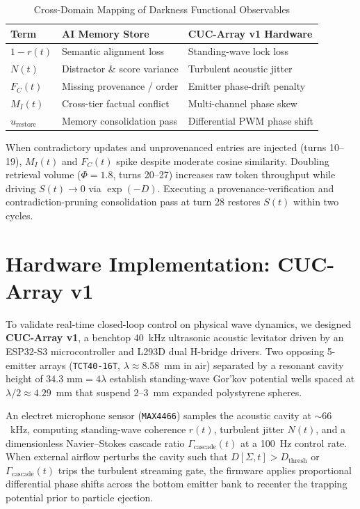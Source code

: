 \documentclass[11pt,twocolumn]{article}
\begin{document}
\begin{table}[h]
\centering
\caption{Cross-Domain Mapping of Darkness Functional Observables}
\label{tab:mapping}
\small
\begin{tabular}{@{}lll@{}}
\toprule
\textbf{Term} & \textbf{AI Memory Store} & \textbf{CUC-Array v1 Hardware} \\
\midrule
$1 - r(t)$ & Semantic alignment loss & Standing-wave lock loss \\
$N(t)$ & Distractor \& score variance & Turbulent acoustic jitter \\
$F_C(t)$ & Missing provenance / order & Emitter phase-drift penalty \\
$M_I(t)$ & Cross-tier factual conflict & Multi-channel phase skew \\
$u_{\text{restore}}$ & Memory consolidation pass & Differential PWM phase shift \\
\bottomrule
\end{tabular}
\end{table}

When contradictory updates and unprovenanced entries are injected (turns 10--19), $M_I(t)$ and $F_C(t)$ spike despite moderate cosine similarity. Doubling retrieval volume ($\Phi = 1.8$, turns 20--27) increases raw token throughput while driving $S(t) \to 0$ via $\exp(-D)$. Executing a provenance-verification and contradiction-pruning consolidation pass at turn 28 restores $S(t)$ within two cycles.

\section{Hardware Implementation: CUC-Array v1}
To validate real-time closed-loop control on physical wave dynamics, we designed \textbf{CUC-Array v1}, a benchtop 40~kHz ultrasonic acoustic levitator driven by an ESP32-S3 microcontroller and L293D dual H-bridge drivers. Two opposing 5-emitter arrays (\texttt{TCT40-16T}, $\lambda \approx 8.58$~mm in air) separated by a resonant cavity height of $34.3\text{ mm} = 4\lambda$ establish standing-wave Gor'kov potential wells spaced at $\lambda/2 \approx 4.29$~mm that suspend 2--3~mm expanded polystyrene spheres.

An electret microphone sensor (\texttt{MAX4466}) samples the acoustic cavity at $\sim 66$~kHz, computing standing-wave coherence $r(t)$, turbulent jitter $N(t)$, and a dimensionless Navier--Stokes cascade ratio $\Gamma_{\text{cascade}}(t)$ at a 100~Hz control rate. When external airflow perturbs the cavity such that $D[\Sigma, t] > D_{\text{thresh}}$ or $\Gamma_{\text{cascade}}(t)$ trips the turbulent streaming gate, the firmware applies proportional differential phase shifts across the bottom emitter bank to recenter the trapping potential prior to particle ejection.
\end{document}

